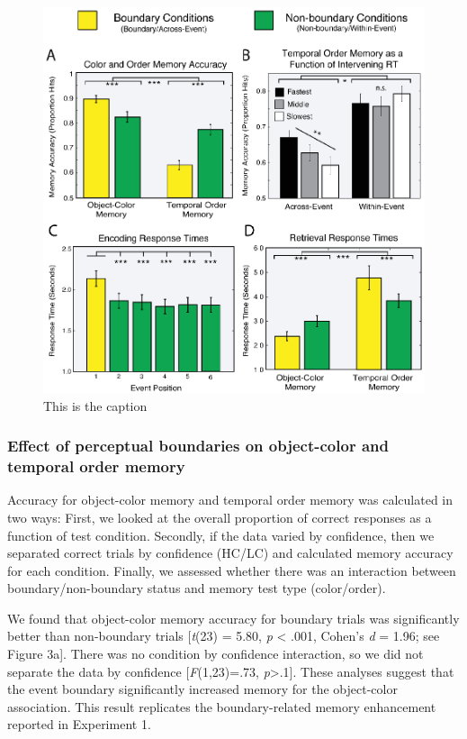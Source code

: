 \begin{figure}[htbp]
\centering
\includegraphics{figures/chapter1_figure3}
\caption{This is the caption}
\end{figure}

\subsubsection{Effect of perceptual boundaries on object-color and
temporal order
memory}\label{effect-of-perceptual-boundaries-on-object-color-and-temporal-order-memory}

Accuracy for object-color memory and temporal order memory was
calculated in two ways: First, we looked at the overall proportion of
correct responses as a function of test condition. Secondly, if the data
varied by confidence, then we separated correct trials by confidence
(HC/LC) and calculated memory accuracy for each condition. Finally, we
assessed whether there was an interaction between boundary/non-boundary
status and memory test type (color/order).

We found that object-color memory accuracy for boundary trials was
significantly better than non-boundary trials {[}\emph{t}(23) = 5.80,
\emph{p} \textless{} .001, Cohen's \emph{d} = 1.96; see Figure 3a{]}.
There was no condition by confidence interaction, so we did not separate
the data by confidence {[}\emph{F}(1,23)=.73,
\emph{p}\textgreater{}.1{]}. These analyses suggest that the event
boundary significantly increased memory for the object-color
association. This result replicates the boundary-related memory
enhancement reported in Experiment 1.

